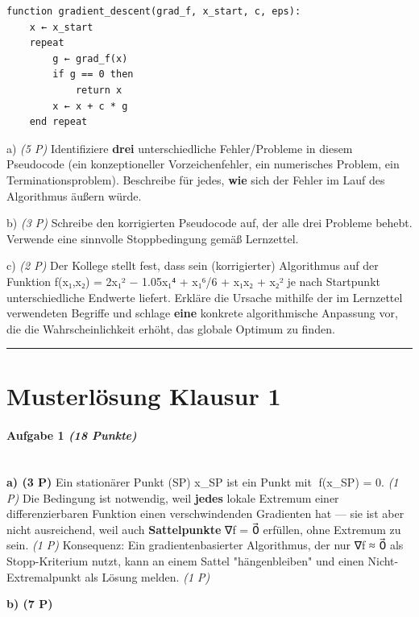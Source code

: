 \documentclass[11pt, a4paper]{article}
\begin{document}
\begin{lstlisting}
function gradient_descent(grad_f, x_start, c, eps):
    x ← x_start
    repeat
        g ← grad_f(x)
        if g == 0 then
            return x
        x ← x + c * g
    end repeat
\end{lstlisting}


a) \textit{(5 P)} Identifiziere \textbf{drei} unterschiedliche Fehler/Probleme in diesem Pseudocode (ein konzeptioneller Vorzeichenfehler, ein numerisches Problem, ein Terminationsproblem). Beschreibe für jedes, \textbf{wie} sich der Fehler im Lauf des Algorithmus äußern würde.


b) \textit{(3 P)} Schreibe den korrigierten Pseudocode auf, der alle drei Probleme behebt. Verwende eine sinnvolle Stoppbedingung gemäß Lernzettel.


c) \textit{(2 P)} Der Kollege stellt fest, dass sein (korrigierter) Algorithmus auf der Funktion f(x₁,x₂) = 2x₁² − 1.05x₁⁴ + x₁⁶/6 + x₁x₂ + x₂² je nach Startpunkt unterschiedliche Endwerte liefert. Erkläre die Ursache mithilfe der im Lernzettel verwendeten Begriffe und schlage \textbf{eine} konkrete algorithmische Anpassung vor, die die Wahrscheinlichkeit erhöht, das globale Optimum zu finden.



\noindent\textcolor{rulegray}{\rule{\linewidth}{0.4pt}}



\section{Musterlösung Klausur 1}

\paragraph{Aufgabe 1 \textit{(18 Punkte)}}\mbox{}\\[2pt]

\textbf{a) (3 P)} Ein stationärer Punkt (SP) x⃗\_SP ist ein Punkt mit ∇f(x⃗\_SP) = 0⃗. \textit{(1 P)} Die Bedingung ist notwendig, weil \textbf{jedes} lokale Extremum einer differenzierbaren Funktion einen verschwindenden Gradienten hat — sie ist aber nicht ausreichend, weil auch \textbf{Sattelpunkte} ∇f = 0⃗ erfüllen, ohne Extremum zu sein. \textit{(1 P)} Konsequenz: Ein gradientenbasierter Algorithmus, der nur ∇f ≈ 0⃗ als Stopp-Kriterium nutzt, kann an einem Sattel "hängenbleiben" und einen Nicht-Extremalpunkt als Lösung melden. \textit{(1 P)}


\textbf{b) (7 P)}
\end{document}
